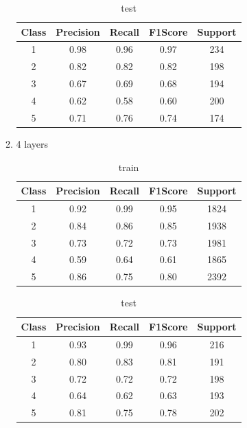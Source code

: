 \begin{enumerate}[label=(\alph*)]
\begin{enumerate}[label=\roman*.]
\begin{table}[!htb]
\begin{tabular}{ccccc}
            \hline
            Class & Precision & Recall & F1Score & Support \\ \hline
            1     & 0.98      & 0.96   & 0.97    & 234     \\
            2     & 0.82      & 0.82   & 0.82    & 198     \\
            3     & 0.67      & 0.69   & 0.68    & 194     \\
            4     & 0.62      & 0.58   & 0.60    & 200     \\
            5     & 0.71      & 0.76   & 0.74    & 174     \\ \hline
            \end{tabular}
            \caption{test}
            \label{part e test depth 3}
        \end{table}
        \newpage
        \item 4 layers
        \begin{table}[!htb]
            \centering
            \begin{tabular}{ccccc}
            \hline
            Class & Precision & Recall & F1Score & Support \\ \hline
            1     & 0.92      & 0.99   & 0.95    & 1824    \\
            2     & 0.84      & 0.86   & 0.85    & 1938    \\
            3     & 0.73      & 0.72   & 0.73    & 1981    \\
            4     & 0.59      & 0.64   & 0.61    & 1865    \\
            5     & 0.86      & 0.75   & 0.80    & 2392    \\ \hline
            \end{tabular}
            \caption{train}
            \label{part e train depth 4}
        \end{table}
        \begin{table}[!htb]
            \centering
            \begin{tabular}{ccccc}
            \hline
            Class & Precision & Recall & F1Score & Support \\ \hline
            1     & 0.93      & 0.99   & 0.96    & 216     \\
            2     & 0.80      & 0.83   & 0.81    & 191     \\
            3     & 0.72      & 0.72   & 0.72    & 198     \\
            4     & 0.64      & 0.62   & 0.63    & 193     \\
            5     & 0.81      & 0.75   & 0.78    & 202     \\ \hline
            \end{tabular}
            \caption{test}
            \label{part e test depth 4}
        \end{table}
        

\end{enumerate}
\end{enumerate}
